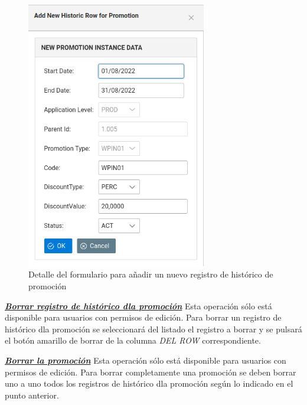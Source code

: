 \begin{figure}[H]
  \centering
  \includegraphics[width=0.70\textwidth]{imaxes/nuevo-historico-promocion.png}
  \caption{Detalle del formulario para añadir un nuevo registro de histórico de promoción}
  \label{fig:nuevo-historico-promocin}
\end{figure}



\underline{\textsl{\textbf{Borrar registro de histórico dla promoción}}}\newline
Esta operación sólo está disponible para usuarios con permisos de edición.
Para borrar un registro de histórico dla promoción se seleccionará del listado el registro a borrar y se pulsará el botón amarillo de borrar de la columna \textit{DEL ROW} correspondiente.\newline

\underline{\textsl{\textbf{Borrar la promoción}}}\newline
Esta operación sólo está disponible para usuarios con permisos de edición.
Para borrar completamente una promoción se deben borrar uno a uno todos los registros de histórico dla promoción según lo indicado en el punto anterior. 





